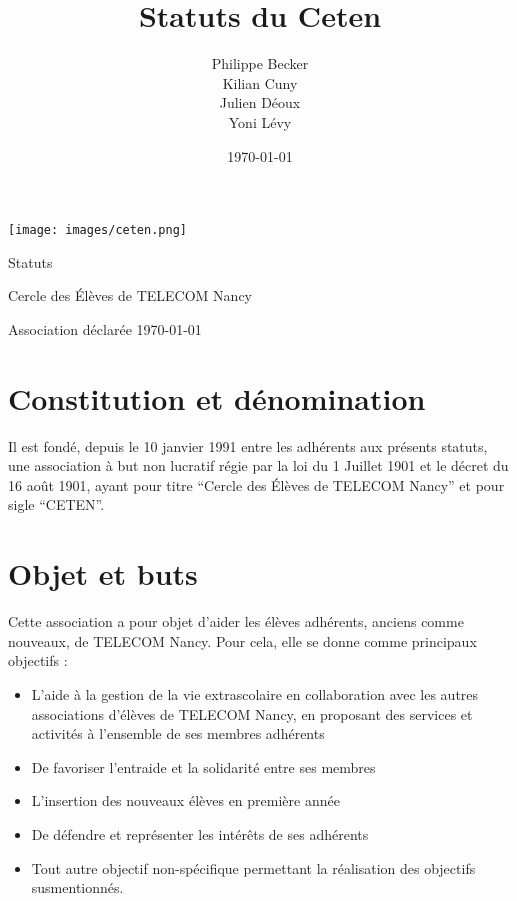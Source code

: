 \documentclass{article}
\title{Statuts du Ceten}
\author{Philippe Becker\\
	Kilian Cuny\\
	Julien Déoux\\
	Yoni Lévy} %
\date\today
\begin{document}

	
	\begin{titlepage}
		\begin{center}
			\texttt{[image: images/ceten.png]}\par
			\vspace{3cm}
			{\Huge \light Statuts}\par
			\vfill
			{\large Cercle des Élèves de TELECOM Nancy}\par
			{\large \light Association déclarée}
			\vfill
			{\light \today}\par
		\end{center}
	\end{titlepage}

	



	\section{Constitution et dénomination}
		Il est fondé, depuis le 10 janvier 1991 entre les adhérents aux présents
		statuts, une association à but non lucratif régie par la loi du 1
		Juillet 1901 et le décret du 16 août 1901, ayant pour titre “Cercle des
		Élèves de TELECOM Nancy” et pour sigle “CETEN”.

	\section{Objet et buts}
	\label{sec:objet}
		Cette association a pour objet d’aider les élèves adhérents, anciens
		comme nouveaux, de TELECOM Nancy. Pour cela, elle se donne comme
		principaux objectifs :
		\begin{itemize}
			\item L’aide à la gestion de la vie extrascolaire en collaboration
				avec les autres associations d'élèves de TELECOM Nancy, en
				proposant des services et activités à l’ensemble de ses membres
				adhérents
			\item De favoriser l’entraide et la solidarité entre ses membres
			\item L’insertion des nouveaux élèves en première année
			\item De défendre et représenter les intérêts de ses adhérents
			\item Tout autre objectif non-spécifique permettant la réalisation
				des objectifs susmentionnés.
		\end{itemize}
\end{document}
